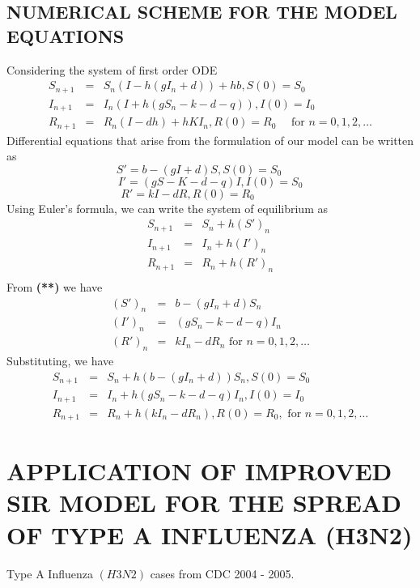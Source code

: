 \documentclass[12pt]{report}
\newcommand{\bt}[1]{\textbf{#1}}
\begin{document}
	\section{NUMERICAL SCHEME FOR THE MODEL EQUATIONS}
	Considering the system of first order ODE\\
	\begin{eqnarray*}
		S_{n+1} &=& S_n(I-h(gI_n+d)) + hb, S(0)=S_0\\
		I_{n+1} &=& I_n(I+h(gS_n-k-d-q)), I(0) = I_0\\
		R_{n+1} &=& R_n(I-dh) + hKI_n, R(0)=R_0 \quad\text{ for } n=0,1,2,\ldots
	\end{eqnarray*}
	Differential equations that arise from the formulation of our model can be written as\\
	\begin{equation}
		S' = b - (gI +d)S, S(0)= S_0\qquad \nonumber
	\end{equation}
	\begin{equation}
		I' = (gS - K -d-q)I, I(0) = S_0 \nonumber
	\end{equation}
	\begin{equation}
		R' = kI - dR, R(0) = R_0\qquad\qquad \tag{**} \label{eq:astt}
	\end{equation}
	Using Euler's formula, we can write the system of equilibrium as
	\begin{eqnarray*}
		S_{n+1} &=& S_n + h(S')_n\\
		I_{n+1} &=& I_n + h(I')_n\\
		R_{n+1} &=& R_n + h(R')_n\\
	\end{eqnarray*}
	From \bt{(**)} we have\\
	\begin{eqnarray*}
		(S')_n &=& b-(gI_n + d)S_n\\
		(I')_n &=& (gS_n - k-d-q)I_n\\
		(R')_n &=& kI_n - dR_n \text{ for } n=0,1,2,\ldots
	\end{eqnarray*}
	Substituting, we have
	\begin{eqnarray*}
		S_{n+1} &=& S_n + h(b-(gI_n+d))S_n, S(0)=S_0\\
		I_{n+1} &=& I_n + h(gS_n - k-d-q)I_n, I(0) = I_0\\
		R_{n+1} &=& R_n + h(kI_n - dR_n), R(0)=R_0, \text{ for  } n=0,1,2,\ldots
	\end{eqnarray*}


	\chapter{APPLICATION OF IMPROVED SIR MODEL FOR THE SPREAD OF TYPE A INFLUENZA (H3N2)}
	Type A Influenza $(H3N2)$ cases from CDC 2004 - 2005.\\
	
\end{document}
